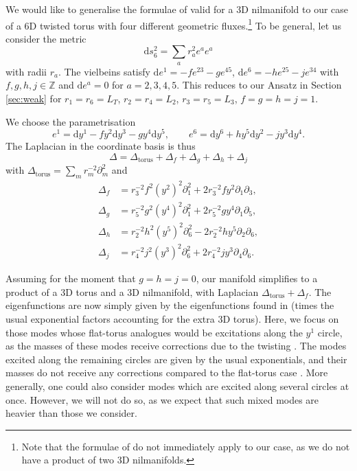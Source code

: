 \documentclass[11pt]{article}
\renewcommand{\[}{\left[}
\renewcommand{\]}{\right]}
\renewcommand{\(}{\left(}
\renewcommand{\)}{\right)}
\renewcommand{\d}{\textrm{d}}
\newcommand{\<}{\langle}
\renewcommand{\>}{\rangle}
\begin{document}
We would like to generalise the formulae of \cite{Andriot:2016rdd} valid for a 3D nilmanifold to our case of a 6D twisted torus with four different geometric fluxes.\footnote{Note that the 
formulae of \cite{Andriot:2016rdd} do not immediately apply to our case, as we do not have a product of two 3D nilmanifolds.}
To be general, let us consider the metric
\begin{equation}
\d s_6^2 = \sum_a r_a^2 e^a e^a \label{m1}
\end{equation}
with radii $r_a$. The vielbeins satisfy $\d e^1 = -f e^{23}- g e^{45}$, $\d e^6 = -h e^{25}- j e^{34}$ with $f,g,h,j\in \mathbb{Z}$ and $\d e^a =0$ for $a=2,3,4,5$. This reduces to our Ansatz in Section \ref{sec:weak} for $r_1=r_6=L_T$, $r_2=r_4=L_2$, $r_3=r_5=L_3$, $f=g=h=j=1$.

We choose the parametrisation
\begin{equation}
e^1 = \d y^1 - f y^2 \d y^3 - g y^4 \d y^5, \qquad e^6 = \d y^6 + h y^5 \d y^2 - j y^3 \d y^4. \label{m2}
\end{equation}
The Laplacian in the coordinate basis is thus
\begin{equation}
\Delta = \Delta_\text{torus} + \Delta_f + \Delta_g+ \Delta_h+ \Delta_j \label{lap}
\end{equation}
with $\Delta_\text{torus}= \sum_m r_m^{-2}\partial_m^2$ and
\begin{align}
\Delta_f &= r_3^{-2}f^2(y^2)^2\partial_1^2 + 2r_3^{-2}fy^2\partial_1\partial_3, \\ \Delta_g &= r_5^{-2}g^2(y^4)^2 \partial_1^2 + 2r_5^{-2}gy^4\partial_1\partial_5, \\ \Delta_h &= r_2^{-2}h^2(y^5)^2\partial_6^2 - 2r_2^{-2}hy^5\partial_2\partial_6, \\ \Delta_j &= r_4^{-2}j^2(y^3)^2 \partial_6^2 + 2r_4^{-2}jy^3\partial_4\partial_6.
\end{align}

Assuming for the moment that $g=h=j=0$, our manifold simplifies to a product of a 3D torus and a 3D nilmanifold, with Laplacian $\Delta_\text{torus} + \Delta_f$. The eigenfunctions are now simply given by the eigenfunctions found in \cite{Andriot:2016rdd} (times the usual exponential factors accounting for the extra 3D torus).
Here, we focus on those modes whose flat-torus analogues would be excitations along the $y^1$ circle, as the masses of these modes receive corrections due to the twisting \cite{Andriot:2016rdd}. The modes excited along the remaining circles are given by the usual exponentials, and their masses do not receive any corrections compared to the flat-torus case \cite{Andriot:2016rdd}. More generally, one could also consider modes which are excited along several circles at once. However, we will not do so, as we expect that such mixed modes are heavier than those we consider.
\end{document}
